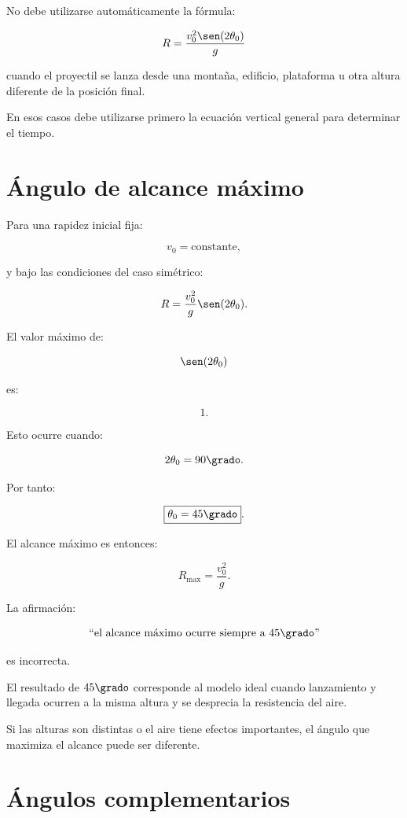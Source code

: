 \begin{errorfrecuente}
No debe utilizarse automáticamente la fórmula:

\[
R
=
\frac{
v_0^2\sen(2\theta_0)
}{
g
}
\]

cuando el proyectil se lanza desde una montaña, edificio, plataforma u otra
altura diferente de la posición final.

En esos casos debe utilizarse primero la ecuación vertical general para
determinar el tiempo.
\end{errorfrecuente}


\section{Ángulo de alcance máximo}

Para una rapidez inicial fija:

\[
v_0=\text{constante},
\]

y bajo las condiciones del caso simétrico:

\[
R
=
\frac{v_0^2}{g}
\sen(2\theta_0).
\]

El valor máximo de:

\[
\sen(2\theta_0)
\]

es:

\[
1.
\]

Esto ocurre cuando:

\[
2\theta_0=90\grado.
\]

Por tanto:

\[
\boxed{
\theta_0=45\grado
}.
\]

El alcance máximo es entonces:

\[
\boxed{
R_{\max}
=
\frac{v_0^2}{g}
}.
\]

\begin{advertencia}
La afirmación:

\[
\text{``el alcance máximo ocurre siempre a }45\grado\text{''}
\]

es incorrecta.

El resultado de \(45\grado\) corresponde al modelo ideal cuando lanzamiento y
llegada ocurren a la misma altura y se desprecia la resistencia del aire.

Si las alturas son distintas o el aire tiene efectos importantes, el ángulo que
maximiza el alcance puede ser diferente.
\end{advertencia}


\section{Ángulos complementarios}

